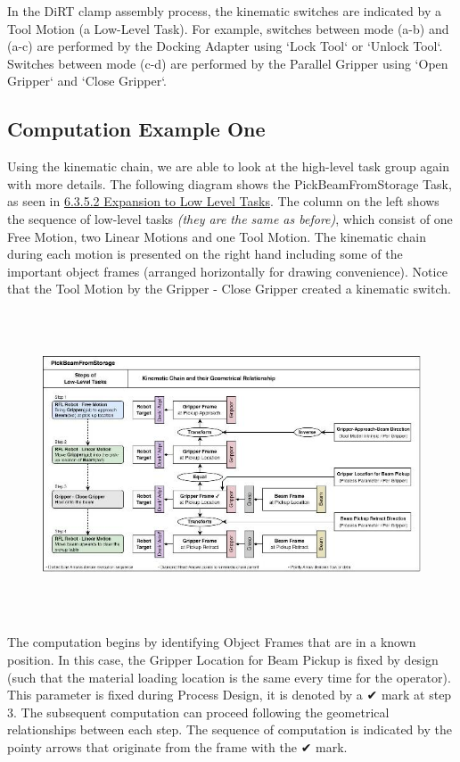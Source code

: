 \documentclass[11pt]{book}
\begin{document}
In the DiRT clamp assembly process, the kinematic switches are indicated by a Tool Motion (a Low-Level Task). For example, switches between mode (a-b) and (a-c) are performed by the Docking Adapter using `Lock Tool` or `Unlock Tool`. Switches between mode (c-d) are performed by the Parallel Gripper using `Open Gripper` and `Close Gripper`.

\subsection{Computation Example One}

Using the kinematic chain, we are able to look at the high-level task group again with more details. The following diagram shows the PickBeamFromStorage Task, as seen in \uline{6.3.5.2 Expansion to Low Level Tasks}. The column on the left shows the sequence of low-level tasks \textit{\textcolor[HTML]{B7B7B7}{(they are the same as before)}}, which consist of one Free Motion, two Linear Motions and one Tool Motion. The kinematic chain during each motion is presented on the right hand including some of the important object frames (arranged horizontally for drawing convenience). Notice that the Tool Motion by the Gripper - Close Gripper created a kinematic switch. 

\begin{figure}[H]
\includegraphics[width=15.92cm,height=9.1cm]{./images/image33.jpeg}
\end{figure}


The computation begins by identifying Object Frames that are in a known position. In this case, the Gripper Location for Beam Pickup is fixed by design (such that the material loading location is the same every time for the operator). This parameter is fixed during Process Design, it is denoted by a ✔ mark at step 3. The subsequent computation can proceed following the geometrical relationships between each step. The sequence of computation is indicated by the pointy arrows that originate from the frame with the ✔ mark. 
\end{document}
